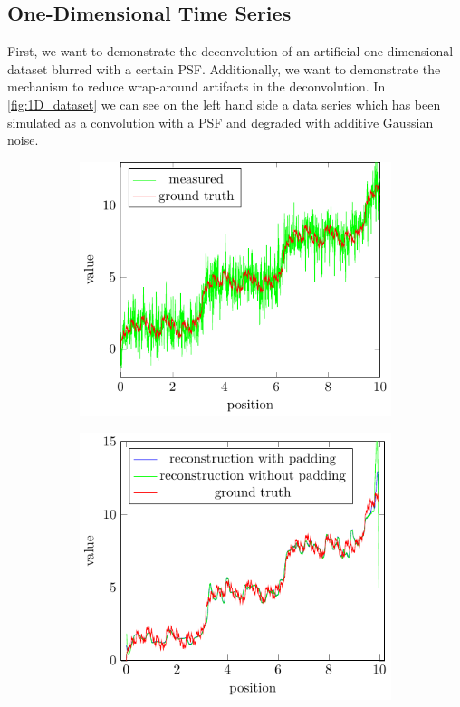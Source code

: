 \documentclass{juliacon}
\begin{document}
    \subsection{One-Dimensional Time Series}
        First, we want to demonstrate the deconvolution of an artificial one dimensional dataset blurred with a certain PSF.
        Additionally, we want to demonstrate the mechanism to reduce wrap-around artifacts in the deconvolution.
        In \autoref{fig:1D_dataset} we can see on the left hand side a data series which has been simulated 
        as a convolution with a PSF and degraded with additive Gaussian noise.
        \begin{figure}[h]
            \begin{subfigure}[b]{.25\textwidth}
                \centering
                \includegraphics[width=\textwidth]{figures/1d_plot_data_blurred.pdf}
                \caption{}
                \label{fig:1D_dataseta}
            \end{subfigure}%
            \begin{subfigure}[b]{.25\textwidth}
                \centering
                \includegraphics[width=\textwidth]{figures/1d_plot_data_res_pad_vs_nopad.pdf}

\end{subfigure}
\end{figure}
\end{document}
